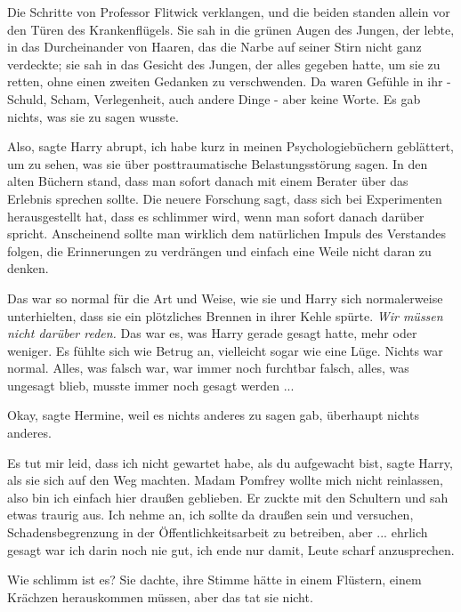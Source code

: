 Die Schritte von Professor Flitwick verklangen, und die beiden standen allein
vor den Türen des Krankenflügels. Sie sah in die grünen Augen des Jungen, der
lebte, in das Durcheinander von Haaren, das die Narbe auf seiner Stirn nicht
ganz verdeckte; sie sah in das Gesicht des Jungen, der alles gegeben hatte, um
sie zu retten, ohne einen zweiten Gedanken zu verschwenden. Da waren Gefühle in
ihr - Schuld, Scham, Verlegenheit, auch andere Dinge - aber keine Worte. Es gab
nichts, was sie zu sagen wusste.

\glqq{}Also\grqq{}, sagte Harry abrupt, \glqq{}ich habe kurz in meinen
Psychologiebüchern geblättert, um zu sehen, was sie über posttraumatische
Belastungsstörung sagen. In den alten Büchern stand, dass man sofort danach mit
einem Berater über das Erlebnis sprechen sollte. Die neuere Forschung sagt, dass
sich bei Experimenten herausgestellt hat, dass es schlimmer wird, wenn man
sofort danach darüber spricht. Anscheinend sollte man wirklich dem natürlichen
Impuls des Verstandes folgen, die Erinnerungen zu verdrängen und einfach eine
Weile nicht daran zu denken.\grqq{}

Das war so normal für die Art und Weise, wie sie und Harry sich normalerweise
unterhielten, dass sie ein plötzliches Brennen in ihrer Kehle spürte. \emph{Wir
müssen nicht darüber reden.} Das war es, was Harry gerade gesagt hatte, mehr
oder weniger. Es fühlte sich wie Betrug an, vielleicht sogar wie eine Lüge.
Nichts war normal. Alles, was falsch war, war immer noch furchtbar falsch,
alles, was ungesagt blieb, musste immer noch gesagt werden ...

\glqq{}Okay\grqq{}, sagte Hermine, weil es nichts anderes zu sagen gab, überhaupt
nichts anderes.

\glqq{}Es tut mir leid, dass ich nicht gewartet habe, als du aufgewacht
bist\grqq{}, sagte Harry, als sie sich auf den Weg machten. \glqq{}Madam Pomfrey
wollte mich nicht reinlassen, also bin ich einfach hier draußen
geblieben.\grqq{} Er zuckte mit den Schultern und sah etwas traurig aus. \glqq{}
Ich nehme an, ich sollte da draußen sein und versuchen, Schadensbegrenzung in
der Öffentlichkeitsarbeit zu betreiben, aber ... ehrlich gesagt war ich darin
noch nie gut, ich ende nur damit, Leute scharf anzusprechen.\grqq{}

\glqq{}Wie schlimm ist es?\grqq{} Sie dachte, ihre Stimme hätte in einem
Flüstern, einem Krächzen herauskommen müssen, aber das tat sie nicht.

